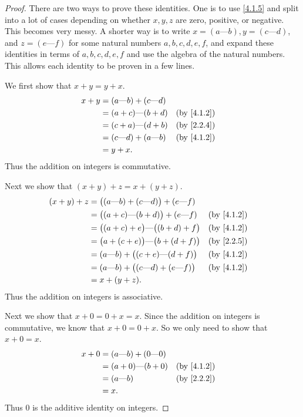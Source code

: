 \begin{proof}
  There are two ways to prove these identities.
  One is to use \cref{4.1.5} and split into a lot of cases depending on whether \(x, y, z\) are zero, positive, or negative.
  This becomes very messy.
  A shorter way is to write \(x = (a \text{---} b), y = (c \text{---} d)\), and \(z = (e \text{---} f)\) for some natural numbers \(a, b, c, d, e, f\), and expand these identities in terms of \(a, b, c, d, e, f\) and use the algebra of the natural numbers.
  This allows each identity to be proven in a few lines.

  We first show that \(x + y = y + x\).
  \begin{align*}
    x + y & = (a \text{---} b) + (c \text{---} d) &                \\
          & = (a + c) \text{---} (b + d)          &   & \by{4.1.2} \\
          & = (c + a) \text{---} (d + b)          &   & \by{2.2.4} \\
          & = (c \text{---} d) + (a \text{---} b) &   & \by{4.1.2} \\
          & = y + x.
  \end{align*}
  Thus the addition on integers is commutative.

  Next we show that \((x + y) + z = x + (y + z)\).
  \begin{align*}
    (x + y) + z & = \big((a \text{---} b) + (c \text{---} d)\big) + (e \text{---} f)                 \\
                & = \big((a + c) \text{---} (b + d)\big) + (e \text{---} f)          &  & \by{4.1.2} \\
                & = \big((a + c) + e\big) \text{---} \big((b + d) + f\big)           &  & \by{4.1.2} \\
                & = \big(a + (c + e)\big) \text{---} \big(b + (d + f)\big)           &  & \by{2.2.5} \\
                & = (a \text{---} b) + \big((c + e) \text{---} (d + f)\big)          &  & \by{4.1.2} \\
                & = (a \text{---} b) + \big((c \text{---} d) + (e \text{---} f)\big) &  & \by{4.1.2} \\
                & = x + (y + z).
  \end{align*}
  Thus the addition on integers is associative.

  Next we show that \(x + 0 = 0 + x = x\).
  Since the addition on integers is commutative, we know that \(x + 0 = 0 + x\).
  So we only need to show that \(x + 0 = x\).
  \begin{align*}
    x + 0 & = (a \text{---} b) + (0 \text{---} 0)                 \\
          & = (a + 0) \text{---} (b + 0)          &  & \by{4.1.2} \\
          & = (a \text{---} b)                    &  & \by{2.2.2} \\
          & = x.
  \end{align*}
  Thus \(0\) is the additive identity on integers.


\end{proof}
